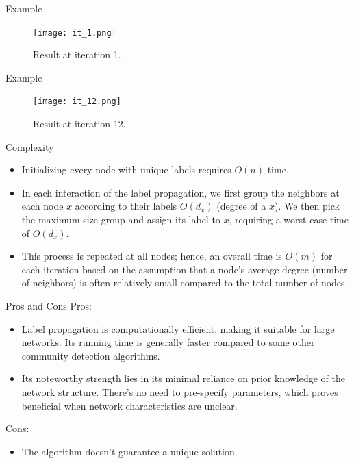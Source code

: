\begin{frame}[fragile]{Example}
\begin{figure}
\centering
\texttt{[image: it\_1.png]}
\caption{Result at iteration 1.}
\end{figure}
\end{frame}

\begin{frame}[fragile]{Example}
\begin{figure}
\centering
\texttt{[image: it\_12.png]}
\caption{Result at iteration 12.}
\end{figure}
\end{frame}

\begin{frame}[fragile]{Complexity}
\begin{itemize}
    \item Initializing every node with unique labels requires $O(n)$ time.
    \item In each interaction of the label propagation, we first group the neighbors at each node $x$ according to their labels $O(d_{x})$ (degree of a $x$). We then pick the maximum size group and assign its label to $x$, requiring a worst-case time of $O(d_{x})$.
    \item This process is repeated at all nodes; hence, an overall time is $O(m)$ for each iteration based on the assumption that a node's average degree (number of neighbors) is often relatively small compared to the total number of nodes.
\end{itemize}
\end{frame}

\begin{frame}[fragile]{Pros and Cons}
Pros:
\begin{itemize}
    \item Label propagation is computationally efficient, making it suitable for large networks. Its running time is generally faster compared to some other community detection algorithms.
    \item Its noteworthy strength lies in its minimal reliance on prior knowledge of the network structure. There's no need to pre-specify parameters, which proves beneficial when network characteristics are unclear.
\end{itemize}
Cons:
\begin{itemize}
    \item The algorithm doesn't guarantee a unique solution.
\end{itemize}
\end{frame}